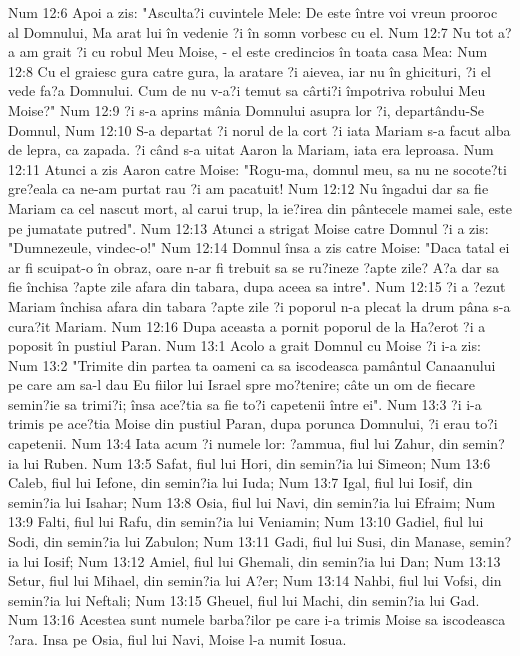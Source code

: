 Num 12:6  Apoi a zis: "Asculta?i cuvintele Mele: De este între voi vreun prooroc al Domnului, Ma arat lui în vedenie ?i în somn vorbesc cu el.
Num 12:7  Nu tot a?a am grait ?i cu robul Meu Moise, - el este credincios în toata casa Mea:
Num 12:8  Cu el graiesc gura catre gura, la aratare ?i aievea, iar nu în ghicituri, ?i el vede fa?a Domnului. Cum de nu v-a?i temut sa cârti?i împotriva robului Meu Moise?"
Num 12:9  ?i s-a aprins mânia Domnului asupra lor ?i, departându-Se Domnul,
Num 12:10  S-a departat ?i norul de la cort ?i iata Mariam s-a facut alba de lepra, ca zapada. ?i când s-a uitat Aaron la Mariam, iata era leproasa.
Num 12:11  Atunci a zis Aaron catre Moise: "Rogu-ma, domnul meu, sa nu ne socote?ti gre?eala ca ne-am purtat rau ?i am pacatuit!
Num 12:12  Nu îngadui dar sa fie Mariam ca cel nascut mort, al carui trup, la ie?irea din pântecele mamei sale, este pe jumatate putred".
Num 12:13  Atunci a strigat Moise catre Domnul ?i a zis: "Dumnezeule, vindec-o!"
Num 12:14  Domnul însa a zis catre Moise: "Daca tatal ei ar fi scuipat-o în obraz, oare n-ar fi trebuit sa se ru?ineze ?apte zile? A?a dar sa fie închisa ?apte zile afara din tabara, dupa aceea sa intre".
Num 12:15  ?i a ?ezut Mariam închisa afara din tabara ?apte zile ?i poporul n-a plecat la drum pâna s-a cura?it Mariam.
Num 12:16  Dupa aceasta a pornit poporul de la Ha?erot ?i a poposit în pustiul Paran.
Num 13:1  Acolo a grait Domnul cu Moise ?i i-a zis:
Num 13:2  "Trimite din partea ta oameni ca sa iscodeasca pamântul Canaanului pe care am sa-l dau Eu fiilor lui Israel spre mo?tenire; câte un om de fiecare semin?ie sa trimi?i; însa ace?tia sa fie to?i capetenii între ei".
Num 13:3  ?i i-a trimis pe ace?tia Moise din pustiul Paran, dupa porunca Domnului, ?i erau to?i capetenii.
Num 13:4  Iata acum ?i numele lor: ?ammua, fiul lui Zahur, din semin?ia lui Ruben.
Num 13:5  Safat, fiul lui Hori, din semin?ia lui Simeon;
Num 13:6  Caleb, fiul lui Iefone, din semin?ia lui Iuda;
Num 13:7  Igal, fiul lui Iosif, din semin?ia lui Isahar;
Num 13:8  Osia, fiul lui Navi, din semin?ia lui Efraim;
Num 13:9  Falti, fiul lui Rafu, din semin?ia lui Veniamin;
Num 13:10  Gadiel, fiul lui Sodi, din semin?ia lui Zabulon;
Num 13:11  Gadi, fiul lui Susi, din Manase, semin?ia lui Iosif;
Num 13:12  Amiel, fiul lui Ghemali, din semin?ia lui Dan;
Num 13:13  Setur, fiul lui Mihael, din semin?ia lui A?er;
Num 13:14  Nahbi, fiul lui Vofsi, din semin?ia lui Neftali;
Num 13:15  Gheuel, fiul lui Machi, din semin?ia lui Gad.
Num 13:16  Acestea sunt numele barba?ilor pe care i-a trimis Moise sa iscodeasca ?ara. Insa pe Osia, fiul lui Navi, Moise l-a numit Iosua.
